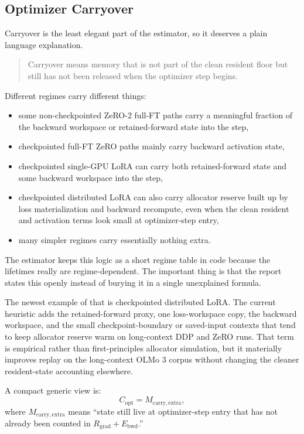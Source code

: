 \subsection{Optimizer Carryover}
Carryover is the least elegant part of the estimator, so it deserves a plain
language explanation.

\begin{quote}
Carryover means memory that is not part of the clean resident floor but still
has not been released when the optimizer step begins.
\end{quote}

Different regimes carry different things:
\begin{itemize}[leftmargin=1.5em]
\item some non-checkpointed ZeRO-2 full-FT paths carry a meaningful fraction of
the backward workspace or retained-forward state into the step,
\item checkpointed full-FT ZeRO paths mainly carry backward activation state,
\item checkpointed single-GPU LoRA can carry both retained-forward state and
some backward workspace into the step,
\item checkpointed distributed LoRA can also carry allocator reserve built up by
loss materialization and backward recompute, even when the clean resident and
activation terms look small at optimizer-step entry,
\item many simpler regimes carry essentially nothing extra.
\end{itemize}

The estimator keeps this logic as a short regime table in code because the
lifetimes really are regime-dependent. The important thing is that the report
states this openly instead of burying it in a single unexplained formula.

The newest example of that is checkpointed distributed LoRA. The current
heuristic adds the retained-forward proxy, one loss-workspace copy, the
backward workspace, and the small checkpoint-boundary or saved-input contexts
that tend to keep allocator reserve warm on long-context DDP and ZeRO runs.
That term is empirical rather than first-principles allocator simulation, but
it materially improves replay on the long-context OLMo 3 corpus without
changing the cleaner resident-state accounting elsewhere.

A compact generic view is:
\[
C_{\mathrm{opt}} = M_{\mathrm{carry,extra}},
\]
where $M_{\mathrm{carry,extra}}$ means ``state still live at optimizer-step
entry that has not already been counted in $R_{\mathrm{grad}} +
E_{\mathrm{bwd}}$.''

